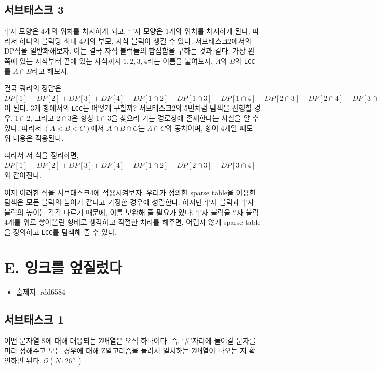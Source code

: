 \documentclass{article}
\begin{document}
	\subsection{서브태스크 3}
	`|'자 모양은 4개의 위치를 차지하게 되고, `$|$'자 모양은 1개의 위치를 차지하게 된다. 따라서 하나의 블럭당 최대 4개의 부모, 자식 블럭이 생길 수 있다. 서브태스크2에서의 DP식을 일반화해보자. 이는 결국 자식 블럭들의 합집합을 구하는 것과 같다. 가장 왼쪽에 있는 자식부터 끝에 있는 자식까지 $1,2,3,4$라는 이름을 붙여보자. $A$와 $B$의 \texttt{LCC}를 $A \cap B$라고 해보자.\newline
	
	결국 쿼리의 정답은 $DP[1] + DP[2] + DP[3] + DP[4] - DP[1\cap2] - DP[1\cap3] - DP[1\cap4] - DP[2\cap3] - DP[2\cap4] - DP[3\cap4] + DP[1\cap2\cap3] + DP[1\cap2\cap4] + DP[1\cap3\cap4] + DP[2\cap3\cap4] - DP[1\cap2\cap3\cap4]$이 된다. $3$개 항에서의 \texttt{LCC}는 어떻게 구할까? 서브태스크2의 5번처럼 탐색을 진행할 경우, $1\cap2$, 그리고 $2\cap3$은 항상 $1\cap3$을 찾으러 가는 경로상에 존재한다는 사실을 알 수 있다. 따라서 $(A < B < C)$에서 $A\cap B\cap C$는 $A \cap C$와 동치이며, 항이 4개일 때도 위 내용은 적용된다.\newline
	
	따라서 저 식을 정리하면, $DP[1] + DP[2] + DP[3] + DP[4] - DP[1\cap2] - DP[2\cap3] - DP[3\cap4]$와 같아진다.\newline
	
	이제 이러한 식을 서브태스크4에 적용시켜보자. 우리가 정의한 sparse table을 이용한 탐색은 모든 블럭의 높이가 같다고 가정한 경우에 성립한다. 하지만 `$|$'자 블럭과 '|'자 블럭의 높이는 각각 다르기 때문에, 이를 보완해 줄 필요가 있다. `$|$'자 블럭을 `.'자 블럭 4개를 위로 쌓아올린 형태로 생각하고 적절한 처리를 해주면, 어렵지 않게 sparse table을 정의하고 \texttt{LCC}를 탐색해 줄 수 있다.
	
	\newpage
	
	\section{E. 잉크를 엎질렀다}
	\begin{itemize}
		\item 출제자: rdd6584
	\end{itemize}
	
	\subsection{서브태스크 1}
	어떤 문자열 S에 대해 대응되는 Z배열은 오직 하나이다. 즉, `\#'자리에 들어갈 문자를 미리 정해주고 모든 경우에 대해 Z알고리즘을 돌려서 일치하는 Z배열이 나오는 지 확인하면 된다. $\mathcal{O}(N \cdot 26^\#)$
	
\end{document}
